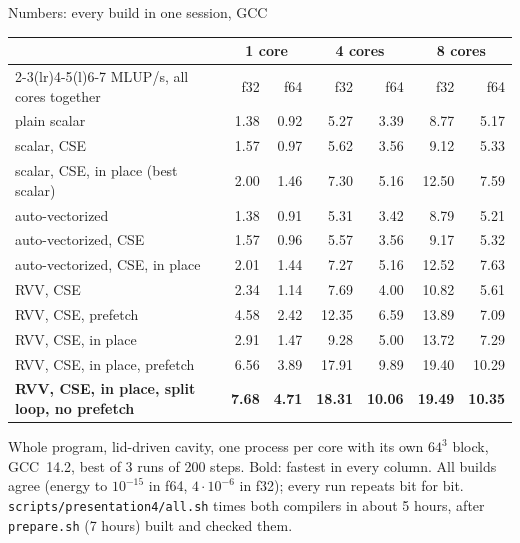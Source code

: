 \documentclass[aspectratio=169,10pt,t]{beamer}
\newcommand{\code}[1]{\texttt{#1}}
\begin{document}
\begin{frame}{Numbers: every build in one session, GCC}
  \vspace{1mm}
  \centering
  {\footnotesize\renewcommand{\arraystretch}{1.05}
  \begin{tabular}{@{}lrrrrrr@{}}
    \toprule
    & \multicolumn{2}{c}{\textbf{1 core}} & \multicolumn{2}{c}{\textbf{4 cores}}
      & \multicolumn{2}{c}{\textbf{8 cores}}\\
    \cmidrule(lr){2-3}\cmidrule(lr){4-5}\cmidrule(l){6-7}
    MLUP/s, all cores together & f32 & f64 & f32 & f64 & f32 & f64\\
    \midrule
    plain scalar & 1.38 & 0.92 & 5.27 & 3.39 & 8.77 & 5.17\\
    scalar, CSE & 1.57 & 0.97 & 5.62 & 3.56 & 9.12 & 5.33\\
    scalar, CSE, in place (best scalar) & 2.00 & 1.46 & 7.30 & 5.16 & 12.50 & 7.59\\
    \midrule
    auto-vectorized & 1.38 & 0.91 & 5.31 & 3.42 & 8.79 & 5.21\\
    auto-vectorized, CSE & 1.57 & 0.96 & 5.57 & 3.56 & 9.17 & 5.32\\
    auto-vectorized, CSE, in place & 2.01 & 1.44 & 7.27 & 5.16 & 12.52 & 7.63\\
    \midrule
    RVV, CSE & 2.34 & 1.14 & 7.69 & 4.00 & 10.82 & 5.61\\
    RVV, CSE, prefetch & 4.58 & 2.42 & 12.35 & 6.59 & 13.89 & 7.09\\
    RVV, CSE, in place & 2.91 & 1.47 & 9.28 & 5.00 & 13.72 & 7.29\\
    RVV, CSE, in place, prefetch & 6.56 & 3.89 & 17.91 & 9.89 & 19.40 & 10.29\\
    \textbf{RVV, CSE, in place, split loop, no prefetch} & \textbf{7.68} & \textbf{4.71} & \textbf{18.31}
      & \textbf{10.06} & \textbf{19.49} & \textbf{10.35}\\
    \bottomrule
  \end{tabular}\par}

  \vspace{3mm}
  \raggedright
  {\scriptsize\color{psgray}
  Whole program, lid-driven cavity, one process per core with its own $64^3$ block, GCC~14.2,
  best of 3 runs of 200 steps. Bold: fastest in every column. All builds agree (energy to $10^{-15}$
  in f64, $4\cdot 10^{-6}$ in f32); every run repeats bit for bit. \code{scripts/presentation4/all.sh}
  times both compilers in about 5 hours, after \code{prepare.sh} (7 hours) built and checked them.\par}
\end{frame}
\end{document}
